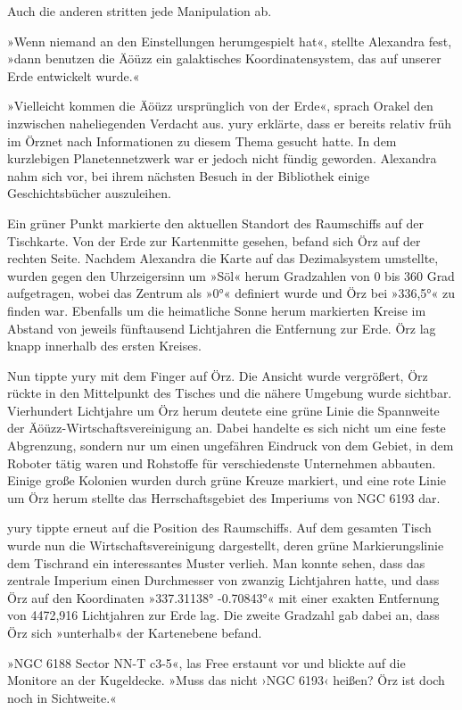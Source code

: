 Auch die anderen stritten jede Manipulation ab.

»Wenn niemand an den Einstellungen herumgespielt hat«, stellte Alexandra fest, »dann benutzen die Äöüzz ein galaktisches Koordinatensystem, das auf unserer Erde entwickelt wurde.«

»Vielleicht kommen die Äöüzz ursprünglich von der Erde«, sprach Orakel den inzwischen naheliegenden Verdacht aus. yury erklärte, dass er bereits relativ früh im Örznet nach Informationen zu diesem Thema gesucht hatte. In dem kurzlebigen Planetennetzwerk war er jedoch nicht fündig geworden. Alexandra nahm sich vor, bei ihrem nächsten Besuch in der Bibliothek einige Geschichtsbücher auszuleihen.

Ein grüner Punkt markierte den aktuellen Standort des Raumschiffs auf der Tischkarte. Von der Erde zur Kartenmitte gesehen, befand sich Örz auf der rechten Seite. Nachdem Alexandra die Karte auf das Dezimalsystem umstellte, wurden gegen den Uhrzeigersinn um »Söl« herum Gradzahlen von 0 bis 360 Grad aufgetragen, wobei das Zentrum als »0°« definiert wurde und Örz bei »336,5°« zu finden war. Ebenfalls um die heimatliche Sonne herum markierten Kreise im Abstand von jeweils fünftausend Lichtjahren die Entfernung zur Erde. Örz lag knapp innerhalb des ersten Kreises.

Nun tippte yury mit dem Finger auf Örz. Die Ansicht wurde vergrößert, Örz rückte in den Mittelpunkt des Tisches und die nähere Umgebung wurde sichtbar. Vierhundert Lichtjahre um Örz herum deutete eine grüne Linie die Spannweite der Äöüzz-Wirtschaftsvereinigung an. Dabei handelte es sich nicht um eine feste Abgrenzung, sondern nur um einen ungefähren Eindruck von dem Gebiet, in dem Roboter tätig waren und Rohstoffe für verschiedenste Unternehmen abbauten. Einige große Kolonien wurden durch grüne Kreuze markiert, und eine rote Linie um Örz herum stellte das Herrschaftsgebiet des Imperiums von NGC 6193 dar.

yury tippte erneut auf die Position des Raumschiffs. Auf dem gesamten Tisch wurde nun die Wirtschaftsvereinigung dargestellt, deren grüne Markierungslinie dem Tischrand ein interessantes Muster verlieh. Man konnte sehen, dass das zentrale Imperium einen Durchmesser von zwanzig Lichtjahren hatte, und dass Örz auf den Koordinaten »337.31138° -0.70843°« mit einer exakten Entfernung von 4472,916 Lichtjahren zur Erde lag. Die zweite Gradzahl gab dabei an, dass Örz sich »unterhalb« der Kartenebene befand.

»NGC 6188 Sector NN-T c3-5«, las Free erstaunt vor und blickte auf die Monitore an der Kugeldecke. »Muss das nicht ›NGC 6193‹ heißen? Örz ist doch noch in Sichtweite.«


